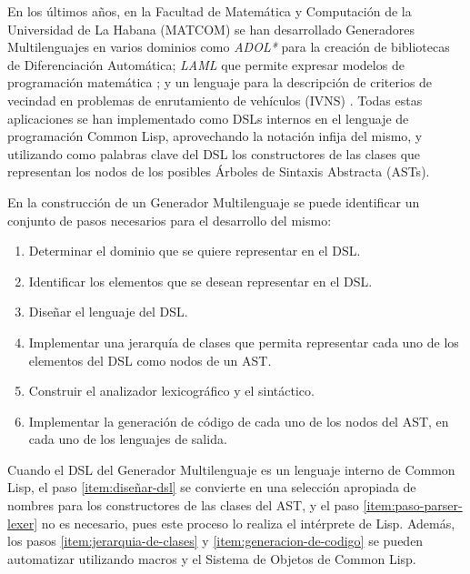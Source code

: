 \begin{introduction}
En los \'ultimos años, en la Facultad de Matemática y Computaci\'on de la Universidad de La Habana (MATCOM) se han desarrollado Generadores Multilenguajes en varios dominios como \emph{ADOL*} para la creaci\'on de bibliotecas de Diferenciaci\'on Autom\'atica;  \emph{LAML} que permite expresar modelos de programación matemática \cite{hoyos}; y un lenguaje para la descripción de criterios de vecindad en problemas de enrutamiento de vehículos (IVNS) \cite{cami}. Todas estas aplicaciones se han implementado como DSLs internos en el lenguaje de programación Common Lisp, aprovechando la notación infija del mismo, y utilizando como palabras clave del DSL los constructores de las clases que representan los nodos de los posibles \'Arboles de Sintaxis Abstracta (ASTs).





En la construcción de un Generador Multilenguaje se puede identificar un conjunto de pasos necesarios para el desarrollo del mismo:

\begin{enumerate}
	\item Determinar el dominio que se quiere representar en el DSL.
	\item Identificar los elementos que se desean representar en el DSL.
	\item \label{item:diseñar-dsl} Dise\~nar el lenguaje del DSL.
	\item \label{item:jerarquia-de-clases}Implementar una jerarqu\'ia de clases que permita representar cada uno de los elementos del DSL como nodos de un AST.
	\item \label{item:paso-parser-lexer} Construir el analizador lexicogr\'afico y el sint\'actico.
	\item 	\label{item:generacion-de-codigo}Implementar la generaci\'on de c\'odigo de cada uno de los nodos del AST, en cada uno de los lenguajes de salida.
  \end{enumerate}

  Cuando el DSL del Generador Multilenguaje es un lenguaje interno de Common Lisp, el paso \ref{item:diseñar-dsl} se convierte en una selección apropiada de nombres para los constructores de las clases del AST, y el paso \ref{item:paso-parser-lexer} no es necesario, pues este proceso lo realiza el intérprete de Lisp. Además, los pasos \ref{item:jerarquia-de-clases} y \ref{item:generacion-de-codigo} se pueden automatizar utilizando macros y el Sistema de Objetos de Common Lisp.


\end{introduction}
